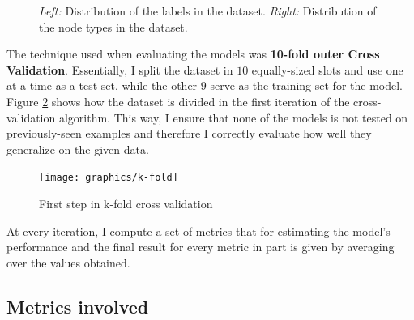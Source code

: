 \begin{figure}[H]
\begin{subfigure}{.4\textwidth}
			\end{subfigure}
			\caption[Distributions of labels and node type in the dataset]{\textit{Left:} Distribution of the labels in the dataset. \textit{Right: }Distribution of the node types in the dataset.}
			\label{Fig: eval/ml/methodology/dist}
		\end{figure} 
		The technique used when evaluating the models was \textbf{10-fold outer Cross Validation}. Essentially, I split the dataset in $10$ equally-sized slots and use one at a time as a test set, while the other $9$ serve as the training set for the model. Figure \ref{Fig: impl/ml/methodology/kfold/first} shows how the dataset is divided in the first iteration of the cross-validation algorithm. This way, I ensure that none of the models is not tested on previously-seen examples and therefore I correctly evaluate how well they generalize on the given data.
		\begin{figure}[H]
			\centering
			\texttt{[image: graphics/k-fold]}
			\caption{First step in k-fold cross validation}
			\label{Fig: impl/ml/methodology/kfold/first}
		\end{figure}
		
		At every iteration, I compute a set of metrics that for estimating the model's performance and the final result for every metric in part is given by averaging over the values obtained. 
	\subsection{Metrics involved} \label{Section: eval/ml/metrics}
	
